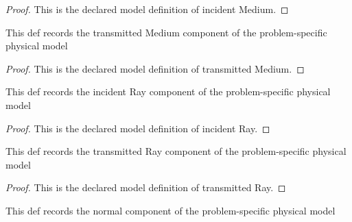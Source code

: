 \begin{proof}
  This is the declared model definition of incident Medium.
\end{proof}
\begin{definition}
  \label{def:physics:phyx-mini-0143:phyxminiproblems-problemphyxmini0143-refractioninterface-transmittedmedium}
  This def records the transmitted Medium component of the problem-specific physical model
\end{definition}
\begin{proof}
  This is the declared model definition of transmitted Medium.
\end{proof}
\begin{definition}
  \label{def:physics:phyx-mini-0143:phyxminiproblems-problemphyxmini0143-refractioninterface-incidentray}
  This def records the incident Ray component of the problem-specific physical model
\end{definition}
\begin{proof}
  This is the declared model definition of incident Ray.
\end{proof}
\begin{definition}
  \label{def:physics:phyx-mini-0143:phyxminiproblems-problemphyxmini0143-refractioninterface-transmittedray}
  This def records the transmitted Ray component of the problem-specific physical model
\end{definition}
\begin{proof}
  This is the declared model definition of transmitted Ray.
\end{proof}
\begin{definition}[normal]
  \label{def:physics:phyx-mini-0143:phyxminiproblems-problemphyxmini0143-refractioninterface-normal}
  This def records the normal component of the problem-specific physical model
\end{definition}
